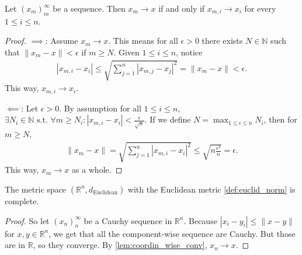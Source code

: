 \begin{lemma}\label{lem:coordin_wise_conv}
    Let $(x_{m})_{m}^{\infty}$ be a sequence. Then $x_{m} \to x$ if and only if $x_{m,i} \to x_{i}$ for every $1 \leq i \leq n$.
\end{lemma}
\begin{proof}
    $\implies$: Assume $x_{m} \to x$. This means for all $\epsilon > 0$ there exists $N \in \mathbb{N}$ such that $\lVert x_{m} - x \rVert < \epsilon$ if $m \geq N$. Given $1 \leq i \leq n$, notice
    \begin{align*}
        \left| x_{m,i} - x_{i} \right| \leq \sqrt{ \sum_{j=1}^{n} \left| x_{m,j} - x_{j} \right|^{2} } = \lVert x_{m} - x \rVert < \epsilon.
    \end{align*}
    This way, $x_{m,i} \to x_{i}$.

    $\impliedby$: Let $\epsilon > 0$. By assumption for all $1 \leq i \leq n$, $\exists N_{i} \in \mathbb{N} \text{ s.t. } \forall m \geq N_{i}: \left| x_{m,i} - x_{i} \right| < \frac{\epsilon}{\sqrt{n}}$. If we define $N = \max_{1 \leq i \leq n} N_{i}$, then for $m \geq N$,
    \begin{align*}
        \lVert x_{m} - x \rVert  = \sqrt{\sum_{j=1}^{n} \left| x_{m,i} - x_{i} \right|^{2}  } \leq \sqrt{n \frac{\epsilon^{2}}{n}} = \epsilon.
    \end{align*}
    This way, $x_{m} \to x$ as a whole.
\end{proof}

\begin{theorem}\label{thm:reals_complete}
    The metric space $(\mathbb{R}^{n}, d_{\text{Euclidean}})$ with the Euclidean metric \ref{def:euclid_norm} is complete.
\end{theorem}
\begin{proof}
    So let $(x_{n})_{n}^{\infty}$ be a Cauchy sequence in $\mathbb{R}^{n}$. Because $\left| x_{i} - y_{i} \right| \leq \lVert x - y \rVert  $ for $x,y \in \mathbb{R}^{n}$, we get that all the component-wise sequence are Cauchy. But those are in $\mathbb{R}$, so they converge. By \ref{lem:coordin_wise_conv}, $x_{n} \to x$.
\end{proof}

